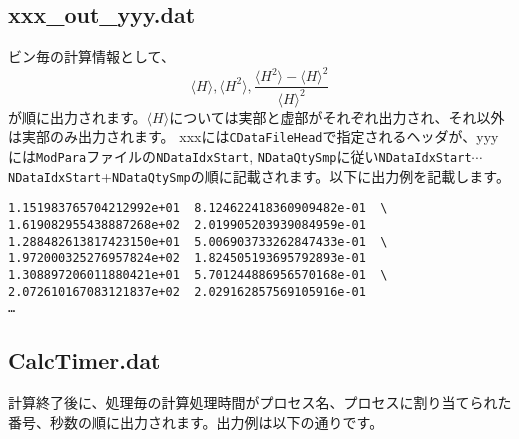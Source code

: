 \subsection{xxx\_out\_yyy.dat}
ビン毎の計算情報として、
\begin{equation}
\langle H \rangle, \langle H^2 \rangle, \frac{\langle H^2 \rangle- \langle H \rangle^2 }{\langle H \rangle^2} \nonumber
\end{equation}
が順に出力されます。$\langle H \rangle$については実部と虚部がそれぞれ出力され、それ以外は実部のみ出力されます。
xxxには\verb|CDataFileHead|で指定されるヘッダが、yyyには\verb|ModPara|ファイルの\verb|NDataIdxStart|, \verb|NDataQtySmp|に従い\verb|NDataIdxStart|$\cdots$\verb|NDataIdxStart|+\verb|NDataQtySmp|の順に記載されます。以下に出力例を記載します。

\begin{minipage}{13cm}
\begin{screen}
\begin{verbatim}
1.151983765704212992e+01  8.124622418360909482e-01  \
1.619082955438887268e+02  2.019905203939084959e-01 
1.288482613817423150e+01  5.006903733262847433e-01  \ 
1.972000325276957824e+02  1.824505193695792893e-01
1.308897206011880421e+01  5.701244886956570168e-01  \
2.072610167083121837e+02  2.029162857569105916e-01
…
\end{verbatim}
\end{screen}
\end{minipage}

\subsection{CalcTimer.dat }
計算終了後に、処理毎の計算処理時間がプロセス名、プロセスに割り当てられた番号、秒数の順に出力されます。出力例は以下の通りです。

